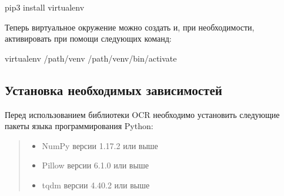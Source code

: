 \documentclass[letterpaper,10pt,russian]{sphinxmanual}
\begin{document}
\begin{sphinxVerbatim}[commandchars=\\\{\}]
pip3 install virtualenv
\end{sphinxVerbatim}

Теперь виртуальное окружение можно создать и, при необходимости, активировать при помощи следующих команд:

\begin{sphinxVerbatim}[commandchars=\\\{\}]
virtualenv /path/venv
 /path/venv/bin/activate
\end{sphinxVerbatim}


\subsection{Установка необходимых зависимостей}
\label{\detokenize{Installation:id8}}
Перед использованием библиотеки OCR необходимо установить следующие пакеты языка программирования Python:
\begin{quote}
\begin{itemize}
\item {} 
NumPy версии 1.17.2 или выше

\end{itemize}

\begin{sphinxVerbatim}[commandchars=\\\{\}]
  
\end{sphinxVerbatim}
\begin{itemize}
\item {} 
Pillow версии 6.1.0 или выше

\end{itemize}

\begin{sphinxVerbatim}[commandchars=\\\{\}]
  
\end{sphinxVerbatim}
\begin{itemize}
\item {} 
tqdm версии 4.40.2 или выше

\end{itemize}

\begin{sphinxVerbatim}[commandchars=\\\{\}]
  
\end{sphinxVerbatim}
\end{quote}
\end{document}
